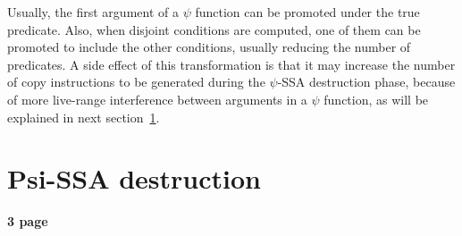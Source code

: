 \begin{itemize}



Usually, the first argument of a $\psi$ function can be promoted
under the {true} predicate. Also, when disjoint conditions are
computed, one of them can be promoted to include the other conditions,
usually reducing the number of predicates. A side effect of this
transformation is that it may increase the number of copy instructions
to be generated during the $\psi$-SSA destruction phase, because of
more live-range interference between arguments in a $\psi$ function,
as will be explained in next section~\ref{sec:Psi_ssa_destruction}.

\end{itemize}

\section{Psi-SSA destruction}
\label{sec:Psi_ssa_destruction}

\textbf{3 page}


